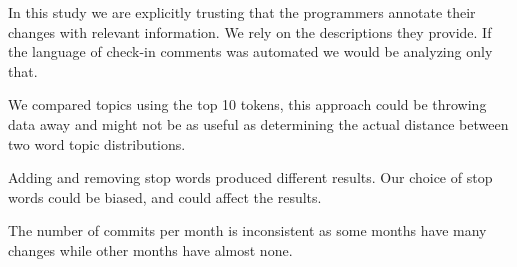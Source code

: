 \documentclass[times, 10pt,twocolumn]{article}
\newcommand{\shrinkit}{\vspace*{-.3em}}
\begin{document}


\shrinkit
{}
\shrinkit

In this study we are explicitly trusting that the programmers annotate
their changes with relevant information. We rely on the descriptions
they provide. If the language of check-in comments was automated we
would  be analyzing only that.

We compared topics using the top 10 tokens, this approach could be
throwing data away and might not be as useful as determining the
actual distance between two word topic distributions.


Adding and removing stop words produced different results. Our choice
of stop words could be biased, and could affect the results.


The number of commits per month is inconsistent as some months have
many changes while other months have almost none.




\shrinkit
{}
\shrinkit





\end{document}

